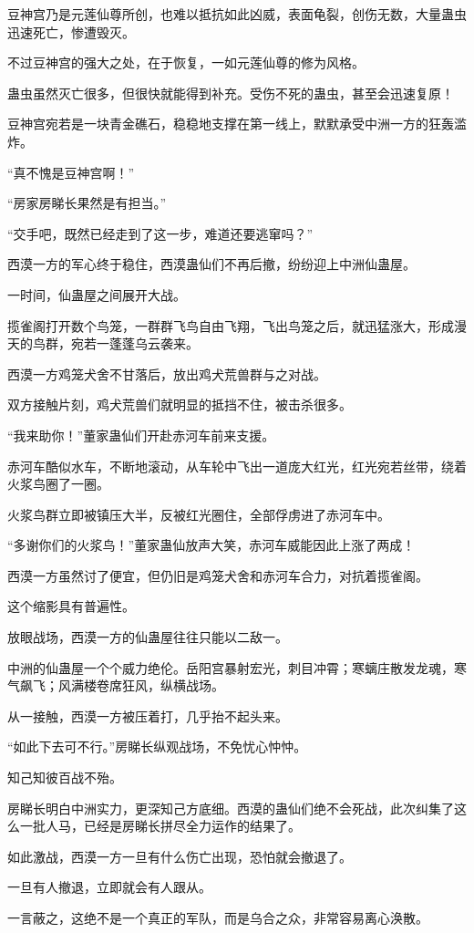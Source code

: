 \begin{this_body}
豆神宫乃是元莲仙尊所创，也难以抵抗如此凶威，表面龟裂，创伤无数，大量蛊虫迅速死亡，惨遭毁灭。

不过豆神宫的强大之处，在于恢复，一如元莲仙尊的修为风格。

蛊虫虽然灭亡很多，但很快就能得到补充。受伤不死的蛊虫，甚至会迅速复原！

豆神宫宛若是一块青金礁石，稳稳地支撑在第一线上，默默承受中洲一方的狂轰滥炸。

“真不愧是豆神宫啊！”

“房家房睇长果然是有担当。”

“交手吧，既然已经走到了这一步，难道还要逃窜吗？”

西漠一方的军心终于稳住，西漠蛊仙们不再后撤，纷纷迎上中洲仙蛊屋。

一时间，仙蛊屋之间展开大战。

揽雀阁打开数个鸟笼，一群群飞鸟自由飞翔，飞出鸟笼之后，就迅猛涨大，形成漫天的鸟群，宛若一蓬蓬乌云袭来。

西漠一方鸡笼犬舍不甘落后，放出鸡犬荒兽群与之对战。

双方接触片刻，鸡犬荒兽们就明显的抵挡不住，被击杀很多。

“我来助你！”董家蛊仙们开赴赤河车前来支援。

赤河车酷似水车，不断地滚动，从车轮中飞出一道庞大红光，红光宛若丝带，绕着火浆鸟圈了一圈。

火浆鸟群立即被镇压大半，反被红光圈住，全部俘虏进了赤河车中。

“多谢你们的火浆鸟！”董家蛊仙放声大笑，赤河车威能因此上涨了两成！

西漠一方虽然讨了便宜，但仍旧是鸡笼犬舍和赤河车合力，对抗着揽雀阁。

这个缩影具有普遍性。

放眼战场，西漠一方的仙蛊屋往往只能以二敌一。

中洲的仙蛊屋一个个威力绝伦。岳阳宫暴射宏光，刺目冲霄；寒螭庄散发龙魂，寒气飙飞；风满楼卷席狂风，纵横战场。

从一接触，西漠一方被压着打，几乎抬不起头来。

“如此下去可不行。”房睇长纵观战场，不免忧心忡忡。

知己知彼百战不殆。

房睇长明白中洲实力，更深知己方底细。西漠的蛊仙们绝不会死战，此次纠集了这么一批人马，已经是房睇长拼尽全力运作的结果了。

如此激战，西漠一方一旦有什么伤亡出现，恐怕就会撤退了。

一旦有人撤退，立即就会有人跟从。

一言蔽之，这绝不是一个真正的军队，而是乌合之众，非常容易离心涣散。


\end{this_body}
